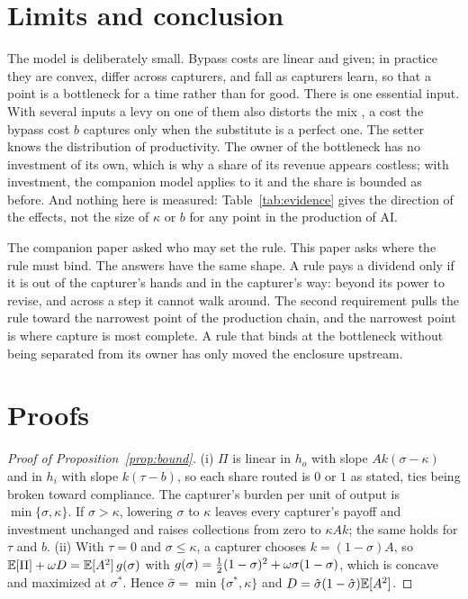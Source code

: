 \section{Limits and conclusion}

The model is deliberately small. Bypass costs are linear and given; in practice they are
convex, differ across capturers, and fall as capturers learn, so that a point is a
bottleneck for a time rather than for good. There is one essential input. With several
inputs a levy on one of them also distorts the mix \citep{DiamondMirrlees1971}, a cost
the bypass cost $b$ captures only when the substitute is a perfect one. The setter knows
the distribution of productivity. The owner of the bottleneck has no investment of its
own, which is why a share of its revenue appears costless; with investment, the
companion model applies to it and the share is bounded as before. And nothing here is
measured: Table~\ref{tab:evidence} gives the direction of the effects, not the size of
$\kappa$ or $b$ for any point in the production of AI.

The companion paper asked who may set the rule. This paper asks where the rule must bind.
The answers have the same shape. A rule pays a dividend only if it is out of the
capturer's hands and in the capturer's way: beyond its power to revise, and across a step
it cannot walk around. The second requirement pulls the rule toward the narrowest point
of the production chain, and the narrowest point is where capture is most complete. A
rule that binds at the bottleneck without being separated from its owner has only moved
the enclosure upstream.

\appendix
\section{Proofs}

\begin{proof}[Proof of Proposition~\ref{prop:bound}]
(i) $\Pi$ is linear in $h_o$ with slope $Ak(\sigma-\kappa)$ and in $h_i$ with slope
$k(\tau-b)$, so each share routed is $0$ or $1$ as stated, ties being broken toward
compliance. The capturer's burden per unit of output is $\min\{\sigma,\kappa\}$. If
$\sigma>\kappa$, lowering $\sigma$ to $\kappa$ leaves every capturer's payoff and
investment unchanged and raises collections from zero to $\kappa Ak$; the same holds for
$\tau$ and $b$. (ii) With $\tau=0$ and $\sigma\le\kappa$, a capturer chooses
$k=(1-\sigma)A$, so $\mathbb{E}[\Pi]+\omega D=\mathbb{E}[A^2]\,g(\sigma)$ with
$g(\sigma)=\tfrac{1}{2}(1-\sigma)^2+\omega\sigma(1-\sigma)$, which is concave and maximized at
$\sigma^*$. Hence $\hat\sigma=\min\{\sigma^*,\kappa\}$ and
$D=\hat\sigma(1-\hat\sigma)\mathbb{E}[A^2]$.
\end{proof}

